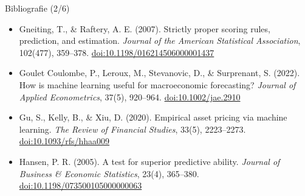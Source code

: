 \begin{frame}{Bibliografie (2/6)}
\begin{itemize}
    \item Gneiting, T., \& Raftery, A. E. (2007). Strictly proper scoring rules, prediction, and estimation. \textit{Journal of the American Statistical Association}, 102(477), 359--378. \href{https://doi.org/10.1198/016214506000001437}{doi:10.1198/016214506000001437}
    \item Goulet Coulombe, P., Leroux, M., Stevanovic, D., \& Surprenant, S. (2022). How is machine learning useful for macroeconomic forecasting? \textit{Journal of Applied Econometrics}, 37(5), 920--964. \href{https://doi.org/10.1002/jae.2910}{doi:10.1002/jae.2910}
    \item Gu, S., Kelly, B., \& Xiu, D. (2020). Empirical asset pricing via machine learning. \textit{The Review of Financial Studies}, 33(5), 2223--2273. \href{https://doi.org/10.1093/rfs/hhaa009}{doi:10.1093/rfs/hhaa009}
    \item Hansen, P. R. (2005). A test for superior predictive ability. \textit{Journal of Business \& Economic Statistics}, 23(4), 365--380. \href{https://doi.org/10.1198/073500105000000063}{doi:10.1198/073500105000000063}
\end{itemize}
\end{frame}

